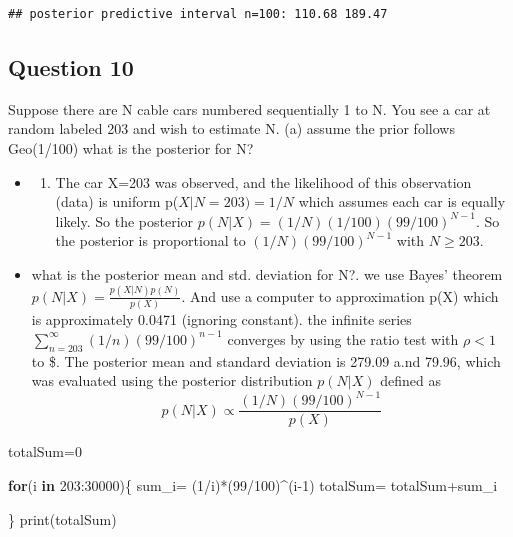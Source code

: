\documentclass[
]{book}
\newenvironment{Shaded}{\begin{snugshade}}{\end{snugshade}}
\newcommand{\ControlFlowTok}[1]{\textcolor[rgb]{0.13,0.29,0.53}{\textbf{#1}}}
\newcommand{\DecValTok}[1]{\textcolor[rgb]{0.00,0.00,0.81}{#1}}
\newcommand{\FunctionTok}[1]{\textcolor[rgb]{0.00,0.00,0.00}{#1}}
\newcommand{\NormalTok}[1]{#1}
\newcommand{\OtherTok}[1]{\textcolor[rgb]{0.56,0.35,0.01}{#1}}
\newcommand{\SpecialCharTok}[1]{\textcolor[rgb]{0.00,0.00,0.00}{#1}}
\providecommand{\tightlist}{%
  \setlength{\itemsep}{0pt}\setlength{\parskip}{0pt}}
\theoremstyle{definition}
\theoremstyle{definition}
\theoremstyle{definition}
\theoremstyle{definition}
\theoremstyle{remark}
\begin{document}
\begin{verbatim}
## posterior predictive interval n=100: 110.68 189.47
\end{verbatim}

\hypertarget{question-10}{%
\subsection*{Question 10}\label{question-10}}

Suppose there are N cable cars numbered sequentially 1 to N. You see a car at random labeled 203 and wish to estimate N. (a) assume the prior follows Geo(1/100) what is the posterior for N?

\begin{itemize}
\item
  \begin{enumerate}
  \def\labelenumi{(\alph{enumi})}
  \tightlist
  \item
    The car X=203 was observed, and the likelihood of this observation (data) is uniform p(\(X|N=203)=1/N\) which assumes each car is equally likely. So the posterior \(p(N|X) = (1/N)(1/100)(99/100)^{N-1}\). So the posterior is proportional to \((1/N)(99/100)^{N-1}\) with \(N\geq 203\).
  \end{enumerate}
\item
  what is the posterior mean and std. deviation for N?.
  we use Bayes' theorem \(p(N|X) = \frac{p(X|N)p(N)}{p(X)}\). And use a computer to approximation p(X) which is approximately 0.0471 (ignoring constant).
  the infinite series \(\sum_{n=203}^\infty (1/n)(99/100)^{n-1}\) converges by using the ratio test with \(\rho<1\) to \$.
  The posterior mean and standard deviation is 279.09 a.nd 79.96, which was evaluated using the posterior distribution \(p(N|X)\) defined as
  \[
   p(N|X) \propto \frac{(1/N)(99/100)^{N-1}}{p(X)}  
  \]
\end{itemize}

\begin{Shaded}
\begin{Highlighting}[]
\NormalTok{ totalSum}\OtherTok{=}\DecValTok{0}
 
 \ControlFlowTok{for}\NormalTok{(i }\ControlFlowTok{in} \DecValTok{203}\SpecialCharTok{:}\DecValTok{30000}\NormalTok{)\{}
\NormalTok{  sum\_i}\OtherTok{=}\NormalTok{ (}\DecValTok{1}\SpecialCharTok{/}\NormalTok{i)}\SpecialCharTok{*}\NormalTok{(}\DecValTok{99}\SpecialCharTok{/}\DecValTok{100}\NormalTok{)}\SpecialCharTok{\^{}}\NormalTok{(i}\DecValTok{{-}1}\NormalTok{)}
\NormalTok{  totalSum}\OtherTok{=}\NormalTok{ totalSum}\SpecialCharTok{+}\NormalTok{sum\_i}
  
\NormalTok{ \}}
 \FunctionTok{print}\NormalTok{(totalSum)}
\end{Highlighting}
\end{Shaded}
\end{document}
